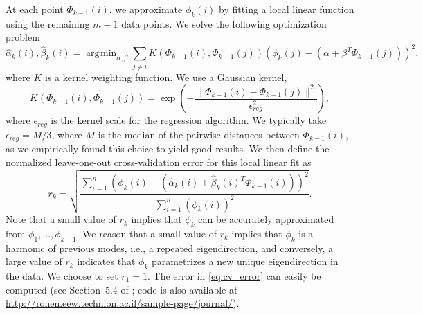 \documentclass[3p]{elsarticle}
\DeclareMathOperator*{\argmin}{\arg\!\min}
\begin{document}
At each point $\Phi_{k-1}(i)$, we approximate $\phi_k(i)$ by fitting a local linear function using the remaining $m-1$ data points.
%
We solve the following optimization problem
\begin{equation} \label{eq:opt_problem}
\hat{\alpha}_k (i) , \hat{\beta}_k(i)  = \argmin_{\alpha, \beta} \sum_{j \ne i} K(\Phi_{k-1}(i), \Phi_{k-1}(j)) \left( \phi_{k}(j) - (\alpha + \beta^T \Phi_{k-1}(j)) \right)^2.
\end{equation}
%
where $K$ is a kernel weighting function.
%
We use a Gaussian kernel,
%
\begin{equation}
K(\Phi_{k-1}(i), \Phi_{k-1}(j))  = \exp \left( - \frac{\|\Phi_{k-1}(i) - \Phi_{k-1} (j) \|^2}{\epsilon_{reg}^2} \right),
\end{equation}
%
where $\epsilon_{reg}$ is the kernel scale for the regression algorithm.
%
We typically take $\epsilon_{reg} = M / 3$, where $M$ is the median of the pairwise distances between $\Phi_{k-1}(i)$,
as we empirically found this choice to yield good results.
%
We then define the normalized leave-one-out cross-validation error for this local linear fit as
\begin{equation} \label{eq:cv_error}
r_{k} = \sqrt{ \frac{\sum_{i=1}^n \left( \phi_{k} (i) - (\hat{\alpha}_k(i) + \hat{\beta}_k(i)^T \Phi_{k-1}(i))  \right)^2} {\sum_{i=1}^n  \left( \phi_{k} (i) \right)^2 }}.
\end{equation}
%
Note that a small value of $r_k$ implies that $\phi_{k}$ can be accurately approximated from $\phi_1, \dots, \phi_{k-1}$.
%
We reason that a small value of $r_k$ implies that $\phi_k$ is a harmonic of previous modes, i.e.,
a repeated eigendirection, and conversely, a large value of $r_{k}$ indicates that $\phi_{k}$
parametrizes a new unique eigendirection in the data.
%
We choose to set $r_1 = 1$.
%
The error in \eqref{eq:cv_error} can easily be computed (see Section~5.4 of \cite{wasserman2006all}; code is also available at \url{http://ronen.eew.technion.ac.il/sample-page/journal/}).
\end{document}
